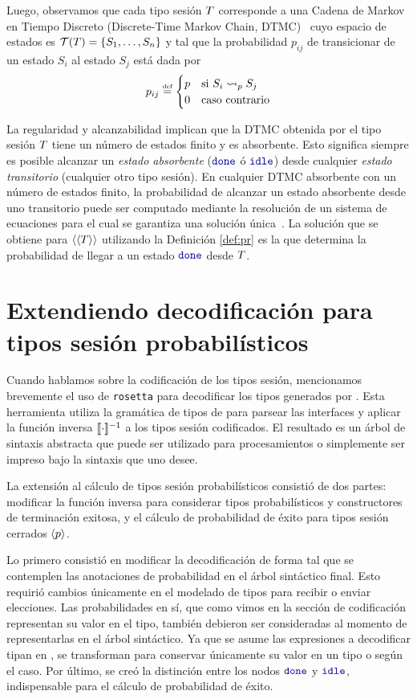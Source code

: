 Luego, observamos que cada tipo sesión $T$ corresponde a una Cadena
de Markov en Tiempo Discreto (Discrete-Time Markov Chain,
DTMC)~\cite{KemenySnell} cuyo espacio de estados es $\trees\SessionType =
\mathset{S_1, \dots, S_n}$ y tal que la probabilidad $p_{ij}$ de transicionar
de un estado $S_i$ al estado $S_j$ está dada por
\[
  p_{ij} \eqdef
  \begin{cases}
    p & \text{si $S_i \tred[p] S_j$}
    \\
    0 & \text{caso contrario}
  \end{cases}
\]
\label{pg:regreach}

La regularidad y alcanzabilidad implican que la DTMC obtenida por el tipo
sesión $T$ tiene un número de estados finito y es absorbente. Esto
significa siempre es posible alcanzar un \emph{estado absorbente} ($\Done$ ó
$\Idle$) desde cualquier \emph{estado transitorio} (cualquier otro tipo sesión).
En cualquier DTMC absorbente con un número de estados finito, la probabilidad
de alcanzar un estado absorbente desde uno transitorio puede ser computado
mediante la resolución de un sistema de ecuaciones para el cual se garantiza
una solución única~\cite{KemenySnell}. La solución que se obtiene para
$\langle\langle T\rangle\rangle$ utilizando la Definición \ref{def:pr} es la que determina
la probabilidad de llegar a un estado $\Done$ desde $T$.

\section{Extendiendo decodificación para tipos sesión probabilísticos}

Cuando hablamos sobre la codificación de los tipos sesión, mencionamos
brevemente el uso de \texttt{rosetta} para decodificar los tipos generados por
\OCaml. Esta herramienta utiliza la gramática de tipos de \OCaml para parsear
las interfaces y aplicar la función inversa $\llbracket\cdot\rrbracket^{-1}$ a los tipos sesión
codificados. El resultado es un árbol de sintaxis abstracta que puede ser
utilizado para procesamientos o simplemente ser impreso bajo la sintaxis que
uno desee.

La extensión al cálculo de tipos sesión probabilísticos consistió de dos
partes: modificar la función inversa para considerar tipos probabilísticos y
constructores de terminación exitosa, y el cálculo de probabilidad de éxito
para tipos sesión cerrados $\langle p \rangle$.

Lo primero consistió en modificar la decodificación de forma tal que se
contemplen las anotaciones de probabilidad en el árbol sintáctico final. Esto
requirió cambios únicamente en el modelado de tipos para recibir o enviar
elecciones. Las probabilidades en sí, que como vimos en la sección de
codificación representan su valor en el tipo, también debieron ser consideradas
al momento de representarlas en el árbol sintáctico. Ya que se asume las
expresiones a decodificar tipan en \OCaml, se transforman para conservar
únicamente su valor en un tipo  o  según el caso. Por último,
se creó la distinción entre los nodos $\Done$ y $\Idle$, indispensable para el
cálculo de probabilidad de éxito.


